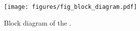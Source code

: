 \begin{figure}[h!]
   \begin{center}
        \texttt{[image: figures/fig\_block\_diagram.pdf]}
   \end{center}
   \caption{Block diagram of the {\it \systemNameFull}.}
	\label{fig:block_diagram}
\end{figure}

